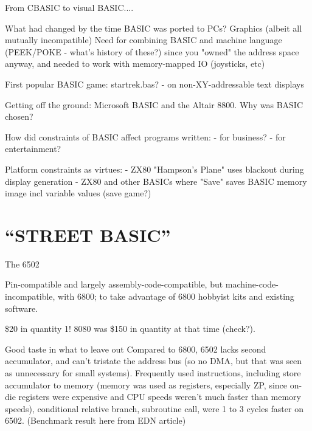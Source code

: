\documentclass{article}
\begin{document}
From CBASIC to visual BASIC....


What had changed by the time BASIC was ported to PCs?
   Graphics (albeit all mutually incompatible)
   Need for combining BASIC and machine language (PEEK/POKE - what's
   history of these?) since you "owned" the address space anyway, and
   needed to work with memory-mapped IO (joysticks, etc)

First popular BASIC game: startrek.bas?
  - on non-XY-addressable text displays

Getting off the ground: Microsoft BASIC and the Altair 8800.  Why was
    BASIC chosen?


How did constraints of BASIC affect programs written:
- for business?
- for entertainment?



Platform constraints as virtues:
 - ZX80 "Hampson's Plane" uses blackout during display generation 
 - ZX80 and other BASICs where "Save" saves BASIC memory image incl
 variable values (save game?)

\section{``STREET BASIC''}

\begin{milestone}{The 6502}

\end{milestone}

Pin-compatible and largely assembly-code-compatible, but
machine-code-incompatible, with 6800; to take advantage of 
6800 hobbyist kits and existing software.

\$20 in quantity 1!  8080 was \$150 in quantity at that time (check?).

    \begin{geeknote}{Good taste in what to leave out}
     Compared to 6800,
     6502 lacks second accumulator, and can't tristate the address bus
     (so no DMA, but that was seen as unnecessary for small systems).
     Frequently used instructions, including store accumulator to memory
     (memory was used as registers, especially ZP, since on-die
     registers were expensive and CPU speeds weren't much faster than
     memory speeds), conditional relative branch, subroutine call, were
     1 to 3 cycles faster on 6502.  (Benchmark result here from EDN
     article) 
    \end{geeknote}
\end{document}
